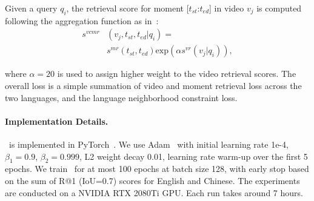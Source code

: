 \noindent
Given a query $q_i$, the retrieval score for moment [$t_{st}$:$t_{ed}$] in video $v_j$ is computed following the aggregation function as in~\cite{lei2020tvr}:
\begin{align}
    s^{vcmr}&(v_j,t_{st}, t_{ed}|q_i) = \nonumber \\ &s^{mr}(t_{st}, t_{ed})\mathrm{exp}(\alpha s^{vr}(v_j|q_i)),
\end{align}


\noindent
where $\alpha{=}20$ is used to assign higher weight to the video retrieval scores.
The overall loss is a simple summation of video and moment retrieval loss across the two languages, and the language neighborhood constraint loss. 








\paragraph{Implementation Details.}
\ModelName~is implemented in PyTorch~\cite{paszke2017automatic}.
We use Adam~\cite{kingma2014adam} with initial learning rate 1e-4, $\beta_1{=}0.9$, $\beta_2{=}0.999$, L2 weight decay 0.01, learning rate warm-up over the first 5 epochs. 
We train \ModelName~for at most 100 epochs at batch size 128, with early stop based on the sum of R@1 (IoU=0.7) scores for English and Chinese.
The experiments are conducted on a NVIDIA RTX 2080Ti GPU. 
Each run takes around 7 hours.



\begin{table}[!t]
\centering
\small
\setlength{\tabcolsep}{3.5pt}
\renewcommand{\arraystretch}{1.05}
\caption{\ModelName~performance on the \DsetName~val split \textit{Friends} examples, in both \textit{unseen} and \textit{seen} settings. 
}
\label{tab:ablation_unseen}
\end{table}



